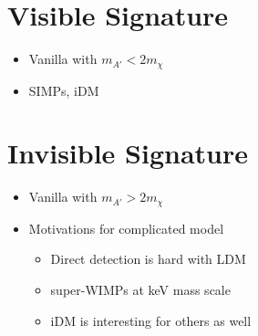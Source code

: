 \section{Visible Signature}
\begin{itemize}
    \item Vanilla with $m_{A'} < 2m_\chi$
    \item SIMPs, iDM
\end{itemize}

\section{Invisible Signature}
\begin{itemize}
    \item Vanilla with $m_{A'} > 2m_\chi$
\end{itemize}

\begin{itemize}
    \item Motivations for complicated model
          \begin{itemize}
              \item Direct detection is hard with LDM \cite{ldmconstraints-2019}
              \item super-WIMPs at keV mass scale \cite{superwimps-2008}
              \item iDM is interesting for others as well \cite{darkseaquest-2018}
          \end{itemize}
\end{itemize}

